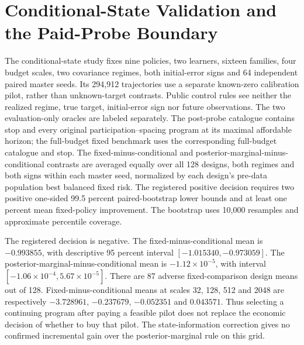 \section{Conditional-State Validation and the Paid-Probe Boundary}
The conditional-state study fixes nine policies, two learners, sixteen families, four budget scales, two covariance regimes, both initial-error signs and 64 independent paired master seeds.
Its 294,912 trajectories use a separate known-zero calibration pilot, rather than unknown-target contrasts.
Public control rules see neither the realized regime, true target, initial-error sign nor future observations.
The two evaluation-only oracles are labeled separately.
The post-probe catalogue contains stop and every original participation--spacing program at its maximal affordable horizon; the full-budget fixed benchmark uses the corresponding full-budget catalogue and stop.
The fixed-minus-conditional and posterior-marginal-minus-conditional contrasts are averaged equally over all 128 designs, both regimes and both signs within each master seed, normalized by each design's pre-data population best balanced fixed risk.
The registered positive decision requires two positive one-sided 99.5 percent paired-bootstrap lower bounds and at least one percent mean fixed-policy improvement.
The bootstrap uses 10,000 resamples and approximate percentile coverage.

The registered decision is negative.
The fixed-minus-conditional mean is $-0.993855$, with descriptive 95 percent interval $[-1.015340,-0.973059]$.
The posterior-marginal-minus-conditional mean is $-1.12\times10^{-5}$, with interval $[-1.06\times10^{-4},5.67\times10^{-5}]$.
There are 87 adverse fixed-comparison design means out of 128.
Fixed-minus-conditional means at scales 32, 128, 512 and 2048 are respectively $-3.728961$, $-0.237679$, $-0.052351$ and $0.043571$.
Thus selecting a continuing program after paying a feasible pilot does not replace the economic decision of whether to buy that pilot.
The state-information correction gives no confirmed incremental gain over the posterior-marginal rule on this grid.

